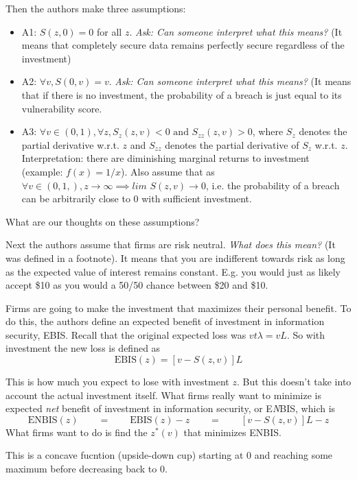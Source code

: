 \documentclass[11pt]{article}
\begin{document}
Then the authors make three assumptions: 
\begin{itemize}
    \item A1: $S(z,0) = 0$ for all $z$. {\it Ask: Can someone interpret what this means?} (It means that completely secure data remains perfectly secure regardless of the investment)
    \item A2: $\forall v, S(0,v) = v$.  {\it Ask: Can someone interpret what this means?} (It means that if there is no investment, the probability of a breach is just equal to its vulnerability score.
    \item A3: $\forall v \in (0,1), \forall z, S_z(z,v) < 0 \text{ and } S_{zz}(z,v)> 0$, where $S_z$ denotes the partial derivative w.r.t. $z$ and $S_{zz}$ denotes the partial derivative of $S_z$ w.r.t. $z$. Interpretation: there are diminishing marginal returns to investment (example: $f(x) = 1/x$). Also assume that as $\forall v \in (0,1,), z \rightarrow \infty \implies \textit{lim } S(z,v) \rightarrow 0$, i.e. the probability of a breach can be arbitrarily close to 0 with sufficient investment. 
\end{itemize}

What are our thoughts on these assumptions?

Next the authors assume that firms are risk neutral. {\it What does this mean?} (It was defined in a footnote). It means that you are indifferent towards risk as long as the expected value of interest remains constant. E.g. you would just as likely accept \$10 as you would a 50/50 chance between \$20 and \$10.

Firms are going to make the investment that maximizes their personal benefit. To do this, the authors define an expected benefit of investment in information security, EBIS. Recall that the original expected loss was $v t \lambda = v L$. So with investment the new loss is defined as 
$$ \text{EBIS}(z) = [v - S(z,v)]L$$

This is how much you expect to lose with investment $z$. But this doesn't take into account the actual investment itself. What firms really want to minimize is expected \textit{net} benefit of investment in information security, or E\textit{N}BIS, which is 
$$\text{ENBIS}(z) \qquad = \qquad \text{EBIS}(z) - z \qquad=\qquad [v - S(z,v)]L - z$$
What firms want to do is find the $z^*(v)$ that minimizes ENBIS.

This is a concave fucntion (upside-down cup) starting at 0 and reaching some maximum before decreasing back to 0. 
\end{document}
